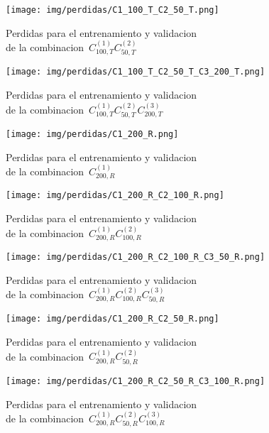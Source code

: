 \begin{figure}[H]
    \centerline{\texttt{[image: img/perdidas/C1\_100\_T\_C2\_50\_T.png]}}
    \caption{Perdidas para el entrenamiento y validacion\\ de la combinacion~$C^{(1)}_{100,T}C^{(2)}_{50,T}$}
    \label{fig:C1_100_T_C2_50_T}
\end{figure}

\begin{figure}[H]
    \centerline{\texttt{[image: img/perdidas/C1\_100\_T\_C2\_50\_T\_C3\_200\_T.png]}}
    \caption{Perdidas para el entrenamiento y validacion\\ de la combinacion~$C^{(1)}_{100,T}C^{(2)}_{50,T}C^{(3)}_{200,T}$}
    \label{fig:C1_100_T_C2_50_T_C3_200_T}
\end{figure}

\begin{figure}[H]
    \centerline{\texttt{[image: img/perdidas/C1\_200\_R.png]}}
    \caption{Perdidas para el entrenamiento y validacion\\ de la combinacion~$C^{(1)}_{200,R}$}
    \label{fig:C1_200_R}
\end{figure}

\begin{figure}[H]
    \centerline{\texttt{[image: img/perdidas/C1\_200\_R\_C2\_100\_R.png]}}
    \caption{Perdidas para el entrenamiento y validacion\\ de la combinacion~$C^{(1)}_{200,R}C^{(2)}_{100,R}$}
    \label{fig:C1_200_R_C2_100_R}
\end{figure}

\begin{figure}[H]
    \centerline{\texttt{[image: img/perdidas/C1\_200\_R\_C2\_100\_R\_C3\_50\_R.png]}}
    \caption{Perdidas para el entrenamiento y validacion\\ de la combinacion~$C^{(1)}_{200,R}C^{(2)}_{100,R}C^{(3)}_{50,R}$}
    \label{fig:C1_200_R_C2_100_R_C3_50_R}
\end{figure}

\begin{figure}[H]
    \centerline{\texttt{[image: img/perdidas/C1\_200\_R\_C2\_50\_R.png]}}
    \caption{Perdidas para el entrenamiento y validacion\\ de la combinacion~$C^{(1)}_{200,R}C^{(2)}_{50,R}$}
    \label{fig:C1_200_R_C2_50_R}
\end{figure}

\begin{figure}[H]
    \centerline{\texttt{[image: img/perdidas/C1\_200\_R\_C2\_50\_R\_C3\_100\_R.png]}}
    \caption{Perdidas para el entrenamiento y validacion\\ de la combinacion~$C^{(1)}_{200,R}C^{(2)}_{50,R}C^{(3)}_{100,R}$}
    \label{fig:C1_200_R_C2_50_R_C3_100_R}
\end{figure}

